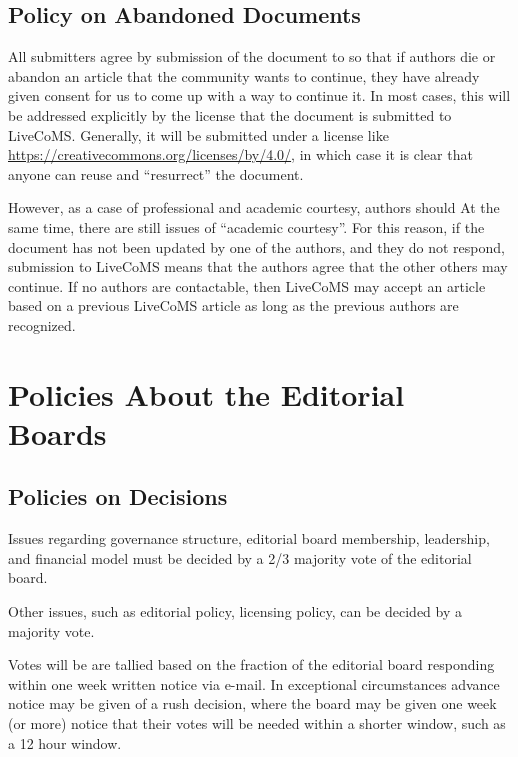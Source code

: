 \documentclass{article}
\begin{document}
\subsection{Policy on Abandoned Documents}

All submitters agree by submission of the document to so that if
authors die or abandon an article that the community wants to
continue, they have already given consent for us to come up with a way
to continue it.  In most cases, this will be addressed explicitly by
the license that the document is submitted to LiveCoMS. Generally, it
will be submitted under a license like \href{Creative Commons
  Attribution}{https://creativecommons.org/licenses/by/4.0/}, in which
case it is clear that anyone can reuse and ``resurrect'' the document.

However, as a case of professional and academic courtesy, authors
should At the same time, there are still issues of ``academic
courtesy''. For this reason, if the document has not been updated by
one of the authors, and they do not respond, submission to LiveCoMS
means that the authors agree that the other others may continue. If no
authors are contactable, then LiveCoMS may accept an article based on
a previous LiveCoMS article as long as the previous authors are
recognized. 

\section{Policies About the Editorial Boards}

\subsection{Policies on Decisions}
Issues regarding governance structure, editorial board membership, leadership, and financial
model must be decided by a 2/3 majority vote of the editorial
board.

Other issues, such as editorial policy, licensing policy, can be
decided by a majority vote.

Votes will be are tallied based on the fraction of the editorial board
responding within one week written notice via e-mail. In exceptional
circumstances advance notice may be given of a rush decision, where
the board may be given one week (or more) notice that their votes will
be needed within a shorter window, such as a 12 hour window.
\end{document}
